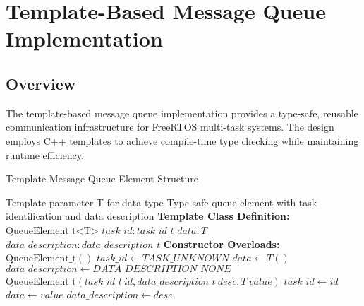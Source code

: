 \documentclass{article}
\begin{document}
\section{Template-Based Message Queue Implementation}

\subsection{Overview}

The template-based message queue implementation provides a type-safe, reusable communication infrastructure for FreeRTOS multi-task systems. The design employs C++ templates to achieve compile-time type checking while maintaining runtime efficiency.

\begin{algorithm}
\caption{Template Message Queue Element Structure}
\label{alg:queue_element_template}
\begin{algorithmic}[1]
\REQUIRE Template parameter T for data type
\ENSURE Type-safe queue element with task identification and data description
\STATE \textbf{Template Class Definition:}
\STATE $\text{QueueElement\_t<T>}$ 
\STATE \quad $task\_id: task\_id\_t$ 
\STATE \quad $data: T$ 
\STATE \quad $data\_description: data\_description\_t$ 
\STATE
\STATE \textbf{Constructor Overloads:}
\STATE $\text{QueueElement\_t}()$ 
\STATE \quad $task\_id \leftarrow TASK\_UNKNOWN$
\STATE \quad $data \leftarrow T()$
\STATE \quad $data\_description \leftarrow DATA\_DESCRIPTION\_NONE$
\STATE
\STATE $\text{QueueElement\_t}(task\_id\_t\ id, data\_description\_t\ desc, T\ value)$
\STATE \quad $task\_id \leftarrow id$
\STATE \quad $data \leftarrow value$
\STATE \quad $data\_description \leftarrow desc$
\end{algorithmic}
\end{algorithm}
\end{document}

